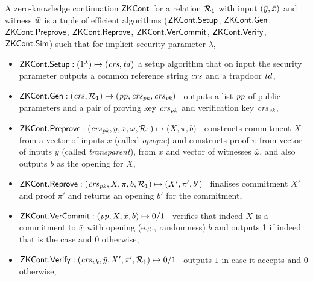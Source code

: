 \begin{definition}[ZK Continuations]
\label{def:zk_cont}
 A zero-knowledge continuation ${\mathsf{ZKCont}}$ for a relation $\mathcal{R}_1$ with 
input $(\bar{y}, \bar{x})$ and witness $\bar{w}$ is a tuple of efficient algorithms 
(${\mathsf{ZKCont}}.{\mathsf{Setup}}$, ${\mathsf{ZKCont}}.\mathsf{Gen}$, ${\mathsf{ZKCont}}.{\mathsf{Preprove}}$, ${\mathsf{ZKCont}}.{\mathsf{Reprove}}$, ${\mathsf{ZKCont}}.{\mathsf{VerCommit}}$, ${\mathsf{ZKCont}}.{\mathsf{Verify}}$, ${\mathsf{ZKCont}}.{\mathsf{Sim}}$) 
such that for implicit security parameter $\lambda$,
\begin{itemize}

\item ${\mathsf{ZKCont}}.{\mathsf{Setup}}: (1^{\lambda}) \mapsto (\mathit{crs}, \mathit{td})$ a setup algorithm that on input the security parameter 
outputs a common reference string $\mathit{crs}$ and a trapdoor $\mathit{td}$,

\item ${\mathsf{ZKCont}}.\mathsf{Gen}: (\mathit{crs}, \mathcal{R}_1) \mapsto (\mathit{pp}, \mathit{crs}_{\mathit{pk}}, \mathit{crs}_{\mathit{vk}})$ \, 
outputs a list $\mathit{pp}$ of public parameters and a pair of proving key $\mathit{crs}_{\mathit{pk}}$ and verification key $\mathit{crs}_{\mathit{vk}}$, 

\item ${\mathsf{ZKCont}}.{\mathsf{Preprove}}: (\mathit{crs}_{\mathit{pk}}, \bar{y}, \bar{x}, \bar{\omega}, \mathcal{R}_1) \mapsto (X, \pi, b)$ \,
constructs commitment $X$ from a vector of inputs $\bar{x}$ (called \emph{opaque}) and 
constructs proof $\pi$ from vector of inputs 
$\bar{y}$ (called \emph{transparent}), from $\bar{x}$ and vector of witnesses $\bar{\omega}$, and 
also outputs $b$ as the opening for $X$,

\item ${\mathsf{ZKCont}}.{\mathsf{Reprove}}: (\mathit{crs}_{\mathit{pk}}, X, \pi, b, \mathcal{R}_1) \mapsto (X', \pi', b')$ \,
finalises commitment $X'$ and proof $\pi'$ and returns an opening $b'$ for the commitment, 

\item ${\mathsf{ZKCont}}.{\mathsf{VerCommit}}: (\mathit{pp}, X, \bar{x}, b) \mapsto 0/1$ \, 
verifies that indeed $X$ is a commitment to $\bar{x}$ with opening (e.g., randomness) $b$ and 
outputs 1 if indeed that is the case and 0 otherwise,
 
\item ${\mathsf{ZKCont}}.{\mathsf{Verify}}: (\mathit{crs}_{\mathit{vk}}, \bar{y}, X', \pi', \mathcal{R}_1) \mapsto 0/1$ \, outputs $1$ in case it accepts and $0$ otherwise,


\end{itemize}
\end{definition}
